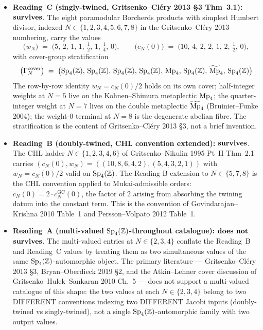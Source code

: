 \begin{itemize}
\item \textbf{Reading~C (singly-twined, Gritsenko--Cl\'ery 2013
\S 3 Thm~3.1):} $\textbf{survives}$. The eight paramodular Borcherds products
with simplest Humbert divisor, indexed $N \in \{1, 2, 3, 4, 5, 6, 7, 8\}$
in the Gritsenko--Cl\'ery 2013 numbering, carry the values
\[
 \bigl(w_N\bigr) \;=\; \bigl(5,\, 2,\, 1,\, 1,\, \tfrac{1}{2},\, 1,\,
 \tfrac{1}{4},\, 0\bigr),
 \qquad
 \bigl(c_N(0)\bigr) \;=\; \bigl(10,\, 4,\, 2,\, 2,\, 1,\, 2,\,
 \tfrac{1}{2},\, 0\bigr),
\]
with cover-group stratification
\[
 \bigl(\Gamma_N^{\mathrm{cover}}\bigr) \;=\;
 \bigl(\mathrm{Sp}_4(\mathbb Z),\, \mathrm{Sp}_4(\mathbb Z),\, \mathrm{Sp}_4(\mathbb Z),\, \mathrm{Sp}_4(\mathbb Z),\, \mathrm{Mp}_4,\,
   \mathrm{Sp}_4(\mathbb Z),\, \widetilde{\mathrm{Mp}}_4,\, \mathrm{Sp}_4(\mathbb Z)\bigr)
\]
The row-by-row identity $w_N = c_N(0)/2$ holds on its own cover;
half-integer weights at $N = 5$ live on the Kohnen--Shimura metaplectic
$\mathrm{Mp}_4$; the quarter-integer weight at $N = 7$ lives on the double
metaplectic $\widetilde{\mathrm{Mp}}_4$ (Bruinier--Funke 2004); the weight-$0$
terminal at $N = 8$ is the degenerate abelian fibre. The stratification
is the content of Gritsenko--Cl\'ery 2013 \S 3, not a brief invention.
\item \textbf{Reading~B (doubly-twined, CHL convention extended):}
$\textbf{survives}$. The CHL ladder $N \in \{1, 2, 3, 4, 6\}$ of
Gritsenko--Nikulin 1995 Pt~II Thm~2.1 carries $(c_N(0), w_N) =
((10, 8, 6, 4, 2), (5, 4, 3, 2, 1))$ with $w_N = c_N(0)/2$ valid on
$\mathrm{Sp}_4(\mathbb Z)$. The Reading-B extension to $N \in \{5, 7, 8\}$ is the CHL
convention applied to Mukai-admissible orders: $c_N(0) = 2 \cdot
c_N^{\mathrm{GC}}(0)$, the factor of $2$ arising from absorbing the
twining datum into the constant term. This is the convention of
Govindarajan--Krishna 2010 Table~1 and Persson--Volpato 2012 Table~1.
\item \textbf{Reading~A (multi-valued $\mathrm{Sp}_4(\mathbb Z)$-throughout catalogue):}
$\textbf{does not}$ $\textbf{survives}$. The multi-valued entries at $N \in \{2, 3, 4\}$
conflate the Reading~B and Reading~C values by treating them as two
simultaneous values of the same $\mathrm{Sp}_4(\mathbb Z)$-automorphic object. The
primary literature --- Gritsenko--Cl\'ery 2013 \S 3, Bryan--Oberdieck
2019 \S 2, and the Atkin--Lehner cover discussion of
Gritsenko--Hulek--Sankaran 2010 Ch.~5 --- does not support a
multi-valued catalogue of this shape: the two values at each $N \in
\{2, 3, 4\}$ belong to two DIFFERENT conventions indexing two
DIFFERENT Jacobi inputs (doubly-twined vs singly-twined), not a
single $\mathrm{Sp}_4(\mathbb Z)$-automorphic family with two output values.
\end{itemize}

